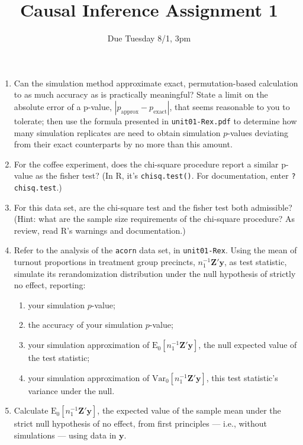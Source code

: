 \documentclass{article}
\title{Causal Inference Assignment 1}
\author{Due Tuesday 8/1, 3pm}
\begin{document}
\maketitle

\begin{enumerate}
\item Can the simulation method approximate exact, permutation-based
  calculation to as much accuracy as is practically meaningful?
  State a limit on the absolute error of a p-value,
  $|p_{\text{approx}} - p_{\text{exact}}|$, that seems reasonable to
  you to tolerate; then use the formula presented in
  \texttt{unit01-Rex.pdf} to determine how many simulation replicates
  are need to obtain simulation $p$-values deviating from their exact
  counterparts by no more than this amount.
\item For the coffee experiment, does the chi-square procedure report
  a similar p-value as the fisher test?  (In R,
  it's \texttt{chisq.test()}. For documentation, enter \texttt{?chisq.test}.)
\item For this data set, are the chi-square test and the fisher test
  both admissible? (Hint: what are the sample size requirements of the
  chi-square procedure? As review, read R's warnings and documentation.)
\item Refer to the analysis of the \texttt{acorn} data set, in
  \texttt{unit01-Rex}.  Using the mean of turnout proportions in
  treatment group precincts, $n_{1}^{-1}\mathbf{Z}'\mathbf{y}$, as
  test statistic, simulate its rerandomization distribution under the
  null hypothesis of strictly no effect, reporting: \label{q:simmoments}
  \begin{enumerate}
  \item your simulation $p$-value; 
  \item the accuracy of your simulation $p$-value; 
  \item your simulation approximation of $\mathrm{E}_{0}[
    n_{1}^{-1}\mathbf{Z}'\mathbf{y}]$, the null expected value of the test
    statistic; 
  \item your simulation approximation of
    $\mathrm{Var}_{0}[n_{1}^{-1}\mathbf{Z}'\mathbf{y}]$, this test
    statistic's variance under the null.
  \end{enumerate}
\item Calculate $\mathrm{E}_{0} [ n_{1}^{-1}\mathbf{Z}'\mathbf{y} ]$, the expected value of the
  sample mean under the strict null hypothesis of no effect, from first principles --- i.e., without simulations ---  using data in $\mathbf{y}$.  \label{q:exactEV}

\end{enumerate}
\end{document}
